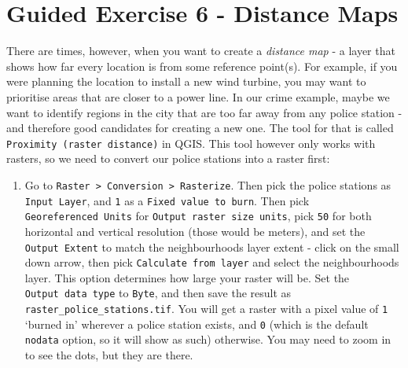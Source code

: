 \documentclass[
  letterpaper,
  DIV=11,
  numbers=noendperiod]{scrreprt}
\providecommand{\tightlist}{%
  \setlength{\itemsep}{0pt}\setlength{\parskip}{0pt}}\usepackage{longtable,booktabs,array}
\begin{document}
\section{Guided Exercise 6 - Distance
Maps}\label{guided-exercise-6---distance-maps}

There are times, however, when you want to create a \emph{distance map}
- a layer that shows how far every location is from some reference
point(s). For example, if you were planning the location to install a
new wind turbine, you may want to prioritise areas that are closer to a
power line. In our crime example, maybe we want to identify regions in
the city that are too far away from any police station - and therefore
good candidates for creating a new one. The tool for that is called
\texttt{Proximity\ (raster\ distance)} in QGIS. This tool however only
works with rasters, so we need to convert our police stations into a
raster first:

\begin{enumerate}
\def\labelenumi{(\arabic{enumi})}
\setcounter{enumi}{348}
\tightlist
\item
  Go to
  \texttt{Raster\ \textgreater{}\ Conversion\ \textgreater{}\ Rasterize}.
  Then pick the police stations as \texttt{Input\ Layer}, and \texttt{1}
  as a \texttt{Fixed\ value\ to\ burn}. Then pick
  \texttt{Georeferenced\ Units} for
  \texttt{Output\ raster\ size\ units}, pick \texttt{50} for both
  horizontal and vertical resolution (those would be meters), and set
  the \texttt{Output\ Extent} to match the neighbourhoods layer extent -
  click on the small down arrow, then pick
  \texttt{Calculate\ from\ layer} and select the neighbourhoods layer.
  This option determines how large your raster will be. Set the
  \texttt{Output\ data\ type} to \texttt{Byte}, and then save the result
  as \texttt{raster\_police\_stations.tif}. You will get a raster with a
  pixel value of \texttt{1} `burned in' wherever a police station
  exists, and \texttt{0} (which is the default \texttt{nodata} option,
  so it will show as such) otherwise. You may need to zoom in to see the
  dots, but they are there.
\end{enumerate}
\end{document}
